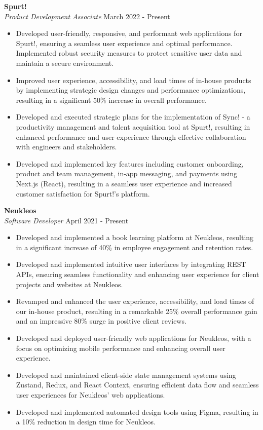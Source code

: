 \documentclass[a4paper]{article}
\begin{document}
      \textbf{Spurt!}\\
          \textit{Product Development Associate} \hfill March 2022 - Present\\
          \vspace{-1mm}
\begin{itemize} \itemsep 1pt
      \item Developed user-friendly, responsive, and performant web applications for Spurt!, ensuring a seamless user experience and optimal performance. Implemented robust security measures to protect sensitive user data and maintain a secure environment.
      \item Improved user experience, accessibility, and load times of in-house products by implementing strategic design changes and performance optimizations, resulting in a significant 50\% increase in overall performance.
      \item Developed and executed strategic plans for the implementation of Sync! - a productivity management and talent acquisition tool at Spurt!, resulting in enhanced performance and user experience through effective collaboration with engineers and stakeholders.
      \item Developed and implemented key features including customer onboarding, product and team management, in-app messaging, and payments using Next.js (React), resulting in a seamless user experience and increased customer satisfaction for Spurt!'s platform.
\end{itemize}
      \textbf{Neukleos}\\
          \textit{Software Developer} \hfill April 2021 - Present\\
          \vspace{-1mm}
\begin{itemize} \itemsep 1pt
      \item Developed and implemented a book learning platform at Neukleos, resulting in a significant increase of 40\% in employee engagement and retention rates.
      \item Developed and implemented intuitive user interfaces by integrating REST APIs, ensuring seamless functionality and enhancing user experience for client projects and websites at Neukleos.
      \item Revamped and enhanced the user experience, accessibility, and load times of our in-house product, resulting in a remarkable 25\% overall performance gain and an impressive 80\% surge in positive client reviews.
      \item Developed and deployed user-friendly web applications for Neukleos, with a focus on optimizing mobile performance and enhancing overall user experience.
      \item Developed and maintained client-side state management systems using Zustand, Redux, and React Context, ensuring efficient data flow and seamless user experiences for Neukleos' web applications.
      \item Developed and implemented automated design tools using Figma, resulting in a 10\% reduction in design time for Neukleos.
\end{itemize}
\end{document}
